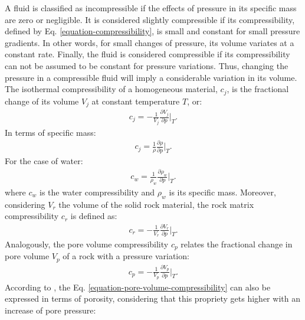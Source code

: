A fluid is classified as incompressible if the effects of pressure in its specific mass are zero or negligible.
%
It is considered slightly compressible if its compressibility, defined by Eq. \ref{equation-compressibility}, is small and constant for small pressure gradients.
%
In other words, for small changes of pressure, its volume variates at a constant rate.
%
Finally, the fluid is considered compressible if its compressibility can not be assumed to be constant for pressure variations.
%
Thus, changing the pressure in a compressible fluid will imply a considerable variation in its volume.
%
The isothermal compressibility of a homogeneous material, $c_j$, is the fractional change of its volume $V_j$ at constant temperature $T$, or:
%
%
\begin{align}
	\label{equation-compressibility}
	c_j=-\frac{1}{V_j} \frac{\partial V_j}{\partial p} \bigg|_T .
\end{align}
%
In terms of specific mass:
%
\begin{align}
	\label{equation-compressibility-specific-mass}
	c_j=\frac{1}{\rho} \frac{\partial \rho}{\partial p} \bigg|_T.
\end{align}
%
For the case of water:
%
\begin{align}
	\label{equation-water-compressibility}
	c_w=\frac{1}{\rho_w} \frac{\partial \rho_w}{\partial p} \bigg|_T.
\end{align}
%
where $c_w$ is the water compressibility and $\rho_w$ is its specific mass.
%
Moreover, considering $V_r$ the volume of the solid rock material, the rock matrix compressibility $c_r$ is defined as:
%
\begin{align}
	\label{equation-rock-compressibility}
	c_r=-\frac{1}{V_r} \frac{\partial V_r}{\partial p} \bigg|_T .
\end{align}
%
Analogously, the pore volume compressibility $c_p$ relates the fractional change in pore volume $V_p$ of a rock with a pressure variation:
%
%
\begin{align}
	\label{equation-pore-volume-compressibility}
	c_p=-\frac{1}{V_p} \frac{\partial V_p}{\partial p} \bigg|_T .
\end{align}
%
According to \cite{Ahmed1946}, the Eq. \ref{equation-pore-volume-compressibility} can also be expressed in terms of porosity, considering that this propriety gets higher with an increase of pore pressure:
